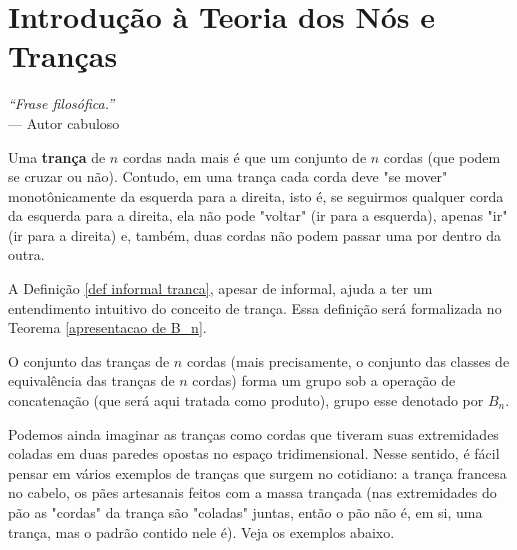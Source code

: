 \chapter[Introdução à Teoria dos Nós e Tranças]{Introdução à Teoria dos Nós e Tranças}
\label{cap-3}
\chaptermark{}
%
\hfill%
\begin{minipage}{10cm}
\begin{flushright}
\rightskip=0.5cm
\textit{``Frase filosófica.''}
\\[0.1cm]
\rightskip=0.5cm
--- Autor cabuloso
\end{flushright}
\end{minipage}

\begin{deff}
		\label{def informal tranca}
		Uma \textbf{trança} de $n$ cordas nada mais é que um conjunto de $n$ cordas (que podem se cruzar ou não). Contudo, em uma trança cada corda deve "se mover" monotônicamente da esquerda para a direita, isto é, se seguirmos qualquer corda da esquerda para a direita, ela não pode "voltar" (ir para a esquerda), apenas "ir" (ir para a direita) e, também, duas cordas não podem passar uma por dentro da outra.
	\end{deff}
	
	\par\vspace{0.3cm} A Definição \eqref{def informal tranca}, apesar de informal, ajuda a ter um entendimento intuitivo do conceito de trança. Essa definição será formalizada no Teorema \eqref{apresentacao de B_n}.
	
	\par\vspace{0.3cm} O conjunto das tranças de $n$ cordas (mais precisamente, o conjunto das classes de equivalência das tranças de $n$ cordas) forma um grupo sob a operação de concatenação (que será aqui tratada como produto), grupo esse denotado por $B_n$. 
	\par\vspace{0.3cm} Podemos ainda imaginar as tranças como cordas que tiveram suas extremidades coladas em duas paredes opostas no espaço tridimensional. Nesse sentido, é fácil pensar em vários exemplos de tranças que surgem no cotidiano: a trança francesa no cabelo, os pães artesanais feitos com a massa trançada (nas extremidades do pão as "cordas" da trança são "coladas" juntas, então o pão não é, em si, uma trança, mas o padrão contido nele é). Veja os exemplos abaixo.
	
